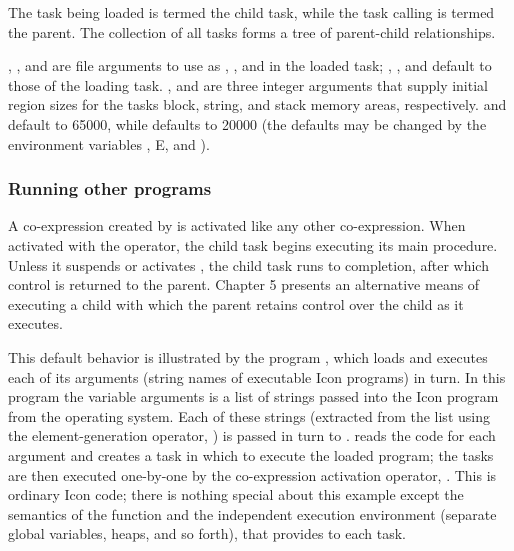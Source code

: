 The task being loaded is termed the child task, while the task calling
 is termed the parent. The
collection of all tasks forms a tree of parent-child
relationships.

, ,
and \textstyleSourceText{ }are file
arguments to use as ,
, and
 in the loaded task;
,
, and
\textstyleSourceText{\textrm{
}}default to those of the loading task.\textstyleSourceText{\textrm{
}} ,
and  are three integer arguments that
supply initial region sizes for the task{\textquotesingle}s block,
string, and stack memory areas, respectively.
 and 
default to 65000, while defaults to
20000 (the defaults may be changed by the environment variables
,
\textsf{E}, and
). 

\subsubsection{Running other programs}

A co-expression created by  is
activated like any other co-expression. When activated with the
 operator, the child task begins
executing its main procedure. Unless it suspends or activates
, the child task runs to
completion, after which control is returned to the parent. Chapter 5
presents an alternative means of executing a child with which the
parent retains control over the child as it executes. 

This default behavior is illustrated by the program
, which loads and executes each
of its arguments (string names of executable Icon programs) in turn. In
this program the variable arguments is a list of strings passed into
the Icon program from the operating system. Each of these strings
(extracted from the list using the element-generation operator,
\textstyleSourceText{\textsf{!}}) is passed in turn to
\textsf{.
} reads the code for each argument
and creates a task in which to execute the loaded program; the tasks
are then executed one-by-one by the co-expression activation operator,
. This is ordinary Icon code; there is
nothing special about this example except the semantics of the
 function and the independent
execution environment (separate global variables, heaps, and so forth),
that \textstyleSourceText{
}provides to each task. 


